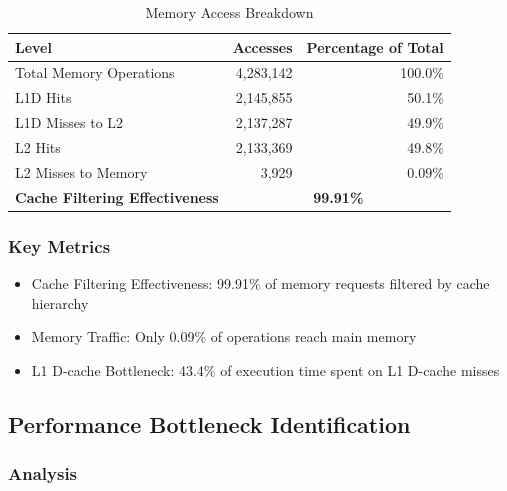 \documentclass[11pt,a4paper]{article}
\begin{document}
\begin{table}[H]
\centering
\caption{Memory Access Breakdown}
\begin{tabular}{lrr}
\toprule
\textbf{Level} & \textbf{Accesses} & \textbf{Percentage of Total} \\
\midrule
Total Memory Operations & 4,283,142 & 100.0\% \\
\quad L1D Hits & 2,145,855 & 50.1\% \\
\quad L1D Misses to L2 & 2,137,287 & 49.9\% \\
\quad\quad L2 Hits & 2,133,369 & 49.8\% \\
\quad\quad L2 Misses to Memory & 3,929 & 0.09\% \\
\midrule
\textbf{Cache Filtering Effectiveness} & \multicolumn{2}{c}{\textbf{99.91\%}} \\
\bottomrule
\end{tabular}
\end{table}

\subsubsection{Key Metrics}
\begin{itemize}[noitemsep]
    \item Cache Filtering Effectiveness: 99.91\% of memory requests filtered by cache hierarchy
    \item Memory Traffic: Only 0.09\% of operations reach main memory
    \item L1 D-cache Bottleneck: 43.4\% of execution time spent on L1 D-cache misses
\end{itemize}

\subsection{Performance Bottleneck Identification}

\subsubsection{Analysis}
\end{document}
